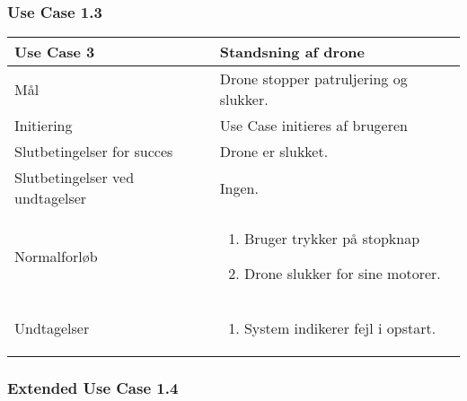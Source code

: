\documentclass[Main]{subfiles}
\begin{document}
	

	
\newpage 
\subsubsection{Use Case 1.3}

\begin{longtable}{|p{}|p{}|}
\hline
Use Case 3 	& 
Standsning af drone \\ \hline

Mål 		& 
Drone stopper patruljering og slukker. \\ \hline

Initiering	& 
Use Case initieres af brugeren \\ \hline

Slutbetingelser for succes & 
Drone er slukket.  \\ \hline

Slutbetingelser ved undtagelser & 
Ingen. \\ \hline

Normalforløb &	\vspace{-8mm}
	\begin{enumerate}
	\item Bruger trykker på stopknap
	\item Drone slukker for sine motorer.
	\end{enumerate} \\ \hline

Undtagelser & \vspace{-8mm}
	\begin{enumerate}
	\item System indikerer fejl i opstart.
	\end{enumerate} \\

\hline
\end{longtable}

	
	
\subsubsection{Extended Use Case 1.4}\label{UC:extend}
\end{document}
